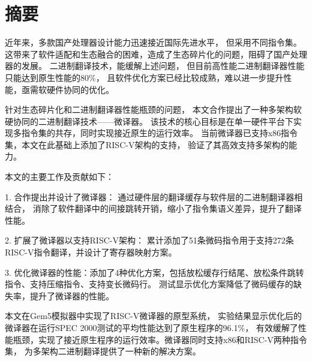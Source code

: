 \maketitle%
\MAKETITLE%
\makedeclaration%
\intobmk\chapter*{摘\quad 要}%
\setcounter{page}{1}%


近年来，多款国产处理器设计能力迅速接近国际先进水平，
但采用不同指令集。
这带来了软件适配和生态融合的困难，造成了生态碎片化的问题，阻碍了国产处理器的发展。
二进制翻译技术，能缓解上述问题，
但目前高性能二进制翻译器性能只能达到原生性能的80\%，
且软件优化方案已经比较成熟，难以进一步提升性能，亟需软硬件协同的优化。

针对生态碎片化和二进制翻译器性能瓶颈的问题，
本文合作提出了一种多架构软硬协同的二进制翻译技术——微译器。
该技术的核心目标是在单一硬件平台下实现多指令集的共存，同时实现接近原生的运行效率。
当前微译器已支持x86指令集，本文在此基础上添加了RISC-V架构的支持，
验证了其高效支持多架构的能力。

本文的主要工作及贡献如下：

1. 合作提出并设计了微译器：
通过硬件层的翻译缓存与软件层的二进制翻译器相结合，
消除了软件翻译中的间接跳转开销，缩小了指令集语义差异，提升了翻译性能。

2. 扩展了微译器以支持RISC-V架构：
累计添加了51条微码指令用于支持272条RISC-V指令翻译，并设计了寄存器映射方案。

3. 优化微译器的性能：添加了4种优化方案，包括放松缓存行结尾、放松条件跳转指令、支持压缩指令、支持变长微码行。
测试显示优化方案降低了微码缓存的缺失率，提升了微译器的性能。

本文在Gem5模拟器中实现了RISC-V微译器的原型系统，
实验结果显示优化后的微译器在运行SPEC 2000测试的平均性能达到了原生程序的96.1\%，
有效缓解了性能瓶颈，实现了接近原生程序的运行效率。微译器同时支持x86和RISC-V两种指令集，
为多架构二进制翻译提供了一种新的解决方案。

